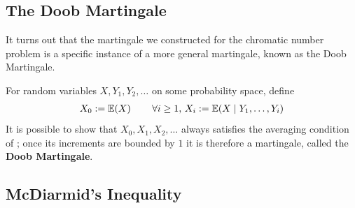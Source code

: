 \subsection{The Doob Martingale}

It turns out that the martingale we constructed for the chromatic number problem is a specific instance of a more general martingale, known as the Doob Martingale.

\begin{boxdefinition} \label{Ch4:Def:Doob}
    For random variables $X, Y_1, Y_2, \ldots$ on some probability space, define
    \begin{align*}
        X_0 := \mathbb{E}\!\left( X \right)
        \qquad
        \forall i \geq 1, \, X_i := \mathbb{E}\!\left( X \mid Y_1, \ldots, Y_i \right)
    \end{align*}
    It is possible to show that $X_0, X_1, X_2, \ldots$ always satisfies the averaging condition of ; once its increments are bounded by $1$ it is therefore a martingale, called the \textbf{Doob Martingale}.
\end{boxdefinition}

\subsection{McDiarmid's Inequality}

